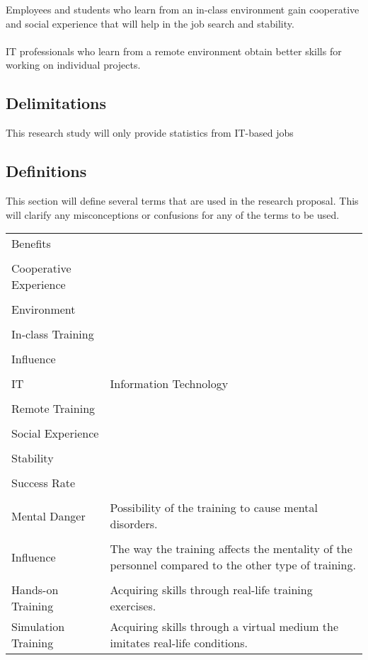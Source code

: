 \documentclass[titlepage]{article}
\begin{document}
Employees and students who learn from an in-class environment gain cooperative and
social experience that will help in the job search and stability.\\
\\
IT professionals who learn from a remote environment obtain better skills for working
on individual projects.

\subsection{Delimitations}
This research study will only provide statistics from IT-based jobs

\subsection{Definitions}
This section will define several terms that are used in the research proposal.  This will clarify
any misconceptions or confusions for any of the terms to be used.

\begin{tabularx}{\textwidth}{lX}
Benefits & \\\\
Cooperative Experience & \\\\
Environment & \\\\
In-class Training & \\\\
Influence & \\\\
IT & Information Technology \\\\
Remote Training & \\\\
Social Experience & \\\\
Stability & \\\\
Success Rate & \\\\

Mental Danger & Possibility of the training to cause mental disorders.\\\\
Influence & The way the training affects the mentality of the personnel compared to the other type of training.\\\\
Hands-on Training & Acquiring skills through real-life training exercises.\\
Simulation Training & Acquiring skills through a virtual medium the imitates real-life conditions.\\
\end{tabularx}
\end{document}
